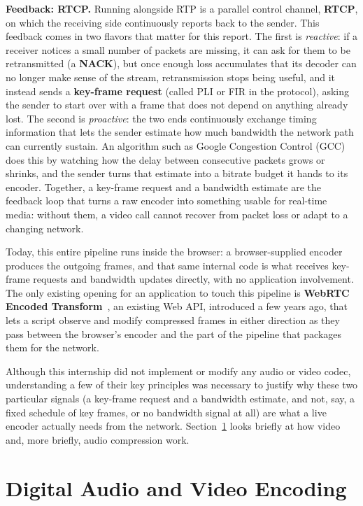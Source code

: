 \documentclass[11pt]{article}
\begin{document}
\textbf{Feedback: RTCP.} Running alongside RTP is a parallel control channel, \textbf{RTCP}, on which the receiving side continuously reports back to the sender. This feedback comes in two flavors that matter for this report. The first is \emph{reactive}: if a receiver notices a small number of packets are missing, it can ask for them to be retransmitted (a \textbf{NACK}), but once enough loss accumulates that its decoder can no longer make sense of the stream, retransmission stops being useful, and it instead sends a \textbf{key-frame request} (called PLI or FIR in the protocol), asking the sender to start over with a frame that does not depend on anything already lost. The second is \emph{proactive}: the two ends continuously exchange timing information that lets the sender estimate how much bandwidth the network path can currently sustain. An algorithm such as Google Congestion Control (GCC)~\cite{gcc} does this by watching how the delay between consecutive packets grows or shrinks, and the sender turns that estimate into a bitrate budget it hands to its encoder. Together, a key-frame request and a bandwidth estimate are the feedback loop that turns a raw encoder into something usable for real-time media: without them, a video call cannot recover from packet loss or adapt to a changing network.

Today, this entire pipeline runs inside the browser: a browser-supplied encoder produces the outgoing frames, and that same internal code is what receives key-frame requests and bandwidth updates directly, with no application involvement. The only existing opening for an application to touch this pipeline is \textbf{WebRTC Encoded Transform}~\cite{encodedtransform}, an existing Web API, introduced a few years ago, that lets a script observe and modify compressed frames in either direction as they pass between the browser's encoder and the part of the pipeline that packages them for the network.

Although this internship did not implement or modify any audio or video codec, understanding a few of their key principles was necessary to justify why these two particular signals (a key-frame request and a bandwidth estimate, and not, say, a fixed schedule of key frames, or no bandwidth signal at all) are what a live encoder actually needs from the network. Section~\ref{sec:encoding} looks briefly at how video and, more briefly, audio compression work.

\section{Digital Audio and Video Encoding}
\label{sec:encoding}
\end{document}

